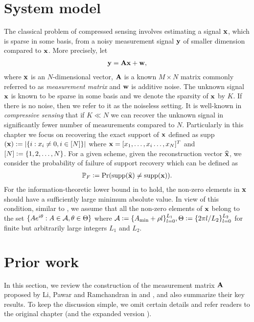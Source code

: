 \section{System model}
The classical problem of compressed sensing involves estimating a signal $\mathbf{x}$, which is sparse in some basis, from a noisy measurement signal $\mathbf{y}$ of smaller dimension compared to $\mathbf{x}$. More precisely, let
\begin{align*}
\mathbf{y=Ax+w},
\end{align*}
where $\mathbf{x}$ is an $N$-dimensional vector, $\mathbf{A}$ is a known $M \times N$ matrix commonly referred to as \emph{measurement matrix} and $\mathbf{w}$ is additive noise. The unknown signal $\mathbf{x}$ is known to be sparse in some basis and we denote the sparsity of $\mathbf{x}$ by $K$. If there is no noise, then we refer to it as the noiseless setting. It is well-known in \emph{compressive sensing} that if $K \ll N$ we can recover the unknown signal in significantly fewer number of measurements compared to $N$.  Particularly in this chapter we focus on recovering the exact support of $\mathbf{x}$ defined as supp$(\mathbf{x}):=\lvert{\{i:x_i\neq 0, i\in[N]\}}\rvert$ where $\mathbf{x}=[x_1,\ldots , x_i \ldots ,x_N]^{T}$ and $[N]\mathrel{\mathop:}=\{1,2,\ldots ,N\}$. For a given scheme, given the reconstruction vector $\widehat{\mathbf{x}}$, we consider the probability of failure of support recovery which can be defined as
\begin{align*}
\mathbb{P}_{F}\mathrel{\mathop:}=\mathrm{Pr}(\text{supp}(\widehat{\mathbf{x}})\neq \text{supp}(\mathbf{x})).
\end{align*}
For the information-theoretic lower bound in \cite{wainwright2009information} to hold, the non-zero elements in $\mathbf{x}$ should have a sufficiently large minimum absolute value. In view of this condition, similar to \cite{li2015subisit,li2015subdraft}, 
 we assume that all the non-zero elements of $\mathbf{x}$ belong to the set $\{Ae^{i\theta}:A\in\mathcal{A},\theta\in\Theta\}$ where $\mathcal{A}\mathrel{\mathop:}= \{A_{\text{min}}+\rho l\}^{L_1}_{l=0},\Theta\mathrel{\mathop:}=\{2\pi l/L_2\}_{l=0}^{L_2}$ for finite but arbitrarily large integers $L_1$ and $L_2$.
\section{Prior work }\label{Sec:Review}
In this section, we review the construction of the measurement matrix $\mathbf{A}$ proposed by Li, Pawar and Ramchandran in \cite{li2015subisit} and \cite{li2015subdraft}, and also summarize their key results. To keep the discussion simple, we omit certain details and refer readers to the original chapter \cite{li2015subisit} (and the expanded version  \cite{li2015subdraft}).

